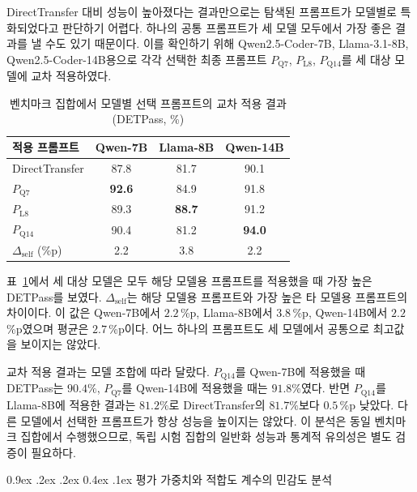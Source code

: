 \documentclass[10pt,twocolumn]{article}
\makeatletter
\newcommand{\rev}[1]{{\color{revisionblue}#1}}
\newenvironment{revision}{\begingroup\color{revisionblue}}{\endgroup}
\renewcommand{\subsection}{\@startsection{subsection}{2}{\z@}%
{0.9ex \@plus .2ex \@minus .2ex}%
{0.4ex \@plus .1ex}%
{\normalfont\normalsize\bfseries}}
\makeatother
\begin{document}
\begin{revision}
DirectTransfer 대비 성능이 높아졌다는 결과만으로는 탐색된 프롬프트가 모델별로 특화되었다고 판단하기 어렵다. 하나의 공통 프롬프트가 세 모델 모두에서 가장 좋은 결과를 낼 수도 있기 때문이다. 이를 확인하기 위해 Qwen2.5-Coder-7B, Llama-3.1-8B, Qwen2.5-Coder-14B용으로 각각 선택한 최종 프롬프트 $P_{\mathrm{Q7}}$, $P_{\mathrm{L8}}$, $P_{\mathrm{Q14}}$를 세 대상 모델에 교차 적용하였다.

\begin{table}[t]
\color{revisionblue}
\centering
\caption{\textcolor{revisionblue}{벤치마크 집합에서 모델별 선택 프롬프트의 교차 적용 결과(DETPass, \%)}}
\label{tab:cross_transfer}
\footnotesize
\renewcommand{\arraystretch}{1.12}
\setlength{\tabcolsep}{4.0pt}
\begin{tabular}{@{}lccc@{}}
\toprule
\textbf{적용 프롬프트} & \textbf{Qwen-7B} & \textbf{Llama-8B} & \textbf{Qwen-14B} \\
\midrule
DirectTransfer & 87.8 & 81.7 & 90.1 \\
\midrule
$P_{\mathrm{Q7}}$ & \textbf{92.6} & 84.9 & 91.8 \\
$P_{\mathrm{L8}}$ & 89.3 & \textbf{88.7} & 91.2 \\
$P_{\mathrm{Q14}}$ & 90.4 & 81.2 & \textbf{94.0} \\
\midrule
$\Delta_{\mathrm{self}}$ (\%p) & 2.2 & 3.8 & 2.2 \\
\bottomrule
\end{tabular}
\end{table}

표~\ref{tab:cross_transfer}에서 세 대상 모델은 모두 해당 모델용 프롬프트를 적용했을 때 가장 높은 DETPass를 보였다. $\Delta_{\mathrm{self}}$는 해당 모델용 프롬프트와 가장 높은 타 모델용 프롬프트의 차이이다. 이 값은 Qwen-7B에서 $2.2$\,\%p, Llama-8B에서 $3.8$\,\%p, Qwen-14B에서 $2.2$\,\%p였으며 평균은 $2.7$\,\%p이다. 어느 하나의 프롬프트도 세 모델에서 공통으로 최고값을 보이지는 않았다.

교차 적용 결과는 모델 조합에 따라 달랐다. $P_{\mathrm{Q14}}$를 Qwen-7B에 적용했을 때 DETPass는 $90.4\%$, $P_{\mathrm{Q7}}$를 Qwen-14B에 적용했을 때는 $91.8\%$였다. 반면 $P_{\mathrm{Q14}}$를 Llama-8B에 적용한 결과는 $81.2\%$로 DirectTransfer의 $81.7\%$보다 $0.5$\,\%p 낮았다. 다른 모델에서 선택한 프롬프트가 항상 성능을 높이지는 않았다. 이 분석은 동일 벤치마크 집합에서 수행했으므로, 독립 시험 집합의 일반화 성능과 통계적 유의성은 별도 검증이 필요하다.
\end{revision}

\subsection{\rev{평가 가중치와 적합도 계수의 민감도 분석}}
\end{document}
